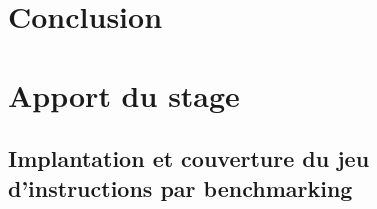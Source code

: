 \documentclass[a4paper,11pt]{article}
\begin{document}
\section{Conclusion}

\section{Apport du stage}


\begin{appendix}
\section{Implantation et couverture du jeu d'instructions par benchmarking}
 
\end{appendix}

% 
% 
\end{document}
